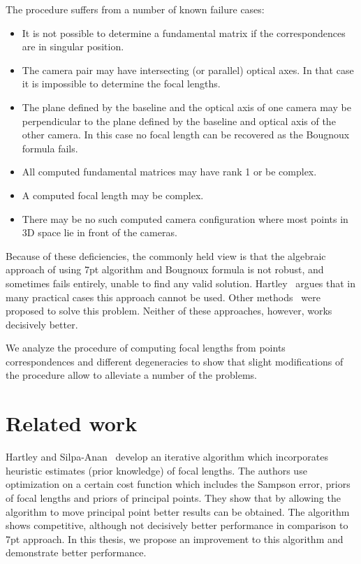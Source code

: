 The procedure suffers from a number of known failure cases:
\begin{itemize}
    \item It is not possible to determine a fundamental matrix if the correspondences are in singular position.
    \item The camera pair may have intersecting (or parallel) optical axes. In that case it is impossible to determine the focal lengths.
    \item The plane defined by the baseline and the optical axis of one camera may be perpendicular to the plane defined by the baseline and optical axis of the other camera. In this case no focal length can be recovered as the Bougnoux formula fails.
    \item All computed fundamental matrices may have rank 1 or be complex. 
    \item A computed focal length may be complex.
    \item There may be no such computed camera configuration where most points in 3D space lie in front of the cameras.
\end{itemize}

Because of these deficiencies, the commonly held view is that the algebraic approach of using 7pt algorithm and Bougnoux formula is not robust, and sometimes fails entirely, unable to find any valid solution. Hartley~\cite{HartleyPriors} argues that in many practical cases this approach cannot be used. Other methods~\cite{HartleyPriors,CNN,KanataniSub} were proposed to solve this problem. Neither of these approaches, however, works decisively better.

We analyze the procedure of computing focal lengths from points correspondences and different degeneracies to show that slight modifications of the procedure allow to alleviate a number of the problems.


\section{Related work}
Hartley and Silpa-Anan~\cite{HartleyPriors}  develop an iterative algorithm which incorporates heuristic estimates (prior knowledge) of focal lengths. The authors use optimization  on a certain cost function which includes the Sampson error, priors of focal lengths and priors of principal points.  They show that by allowing the algorithm to move principal point better results can be obtained. 
The algorithm shows competitive, although not decisively better performance in comparison to 7pt approach. In this thesis, we propose an improvement to this algorithm and demonstrate better performance.

